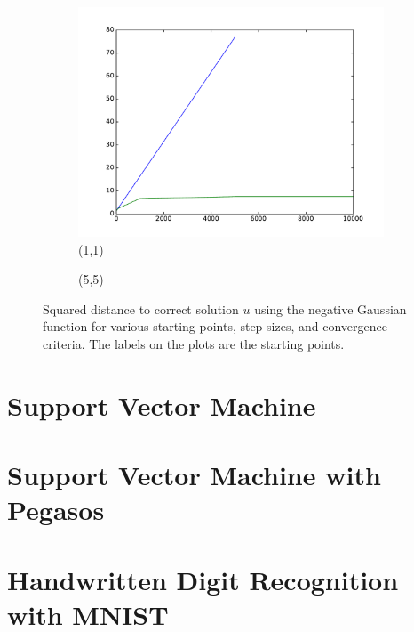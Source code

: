 \documentclass[10pt,psamsfonts]{amsart}
\theoremstyle{definition}
\theoremstyle{remark}
\numberwithin{equation}{section}
\begin{document}
\begin{figure}[b]
	\centering
	\begin{subfigure}[b]{0.23\textwidth}
		\includegraphics[width=\textwidth]{hw2_1-1_1.pdf}
		\caption{(1,1)}
	\end{subfigure}
	\begin{subfigure}[b]{0.23\textwidth}
		\caption{(5,5)}
	\end{subfigure}
	\caption{Squared distance to correct solution $u$ using the negative Gaussian function for various starting points, step sizes, and convergence criteria. The labels on the plots are the starting points.}
\end{figure}

\section{Support Vector Machine}

\section{Support Vector Machine with Pegasos}

\section{Handwritten Digit Recognition with MNIST}
\end{document}
